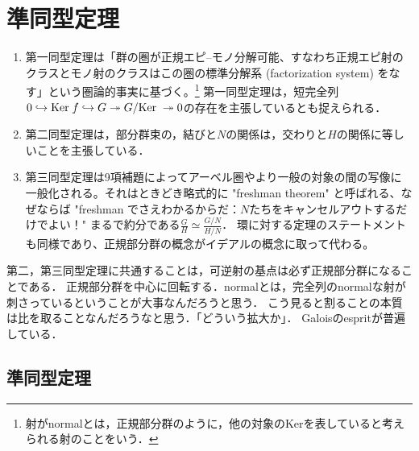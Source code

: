 \documentclass[uplatex,dvipdfmx]{jsreport}
\begin{document}
\section{準同型定理}

\begin{tcolorbox}[colframe=ForestGreen, colback=ForestGreen!10!white,breakable,colbacktitle=ForestGreen!40!white,coltitle=black,fonttitle=\bfseries\sffamily,
title=]
    \begin{enumerate}
        \item 第一同型定理は「群の圏が正規エピ–モノ分解可能、すなわち正規エピ射のクラスとモノ射のクラスはこの圏の標準分解系 (factorization system) をなす」という圏論的事実に基づく。\footnote{射がnormalとは，正規部分群のように，他の対象のKerを表していると考えられる射のことをいう．}
        第一同型定理は，短完全列$0\hookrightarrow\mathrm{Ker}\; f\hookrightarrow G\twoheadrightarrow G/\mathrm{Ker}\;\twoheadrightarrow 0$の存在を主張しているとも捉えられる．
        \item 第二同型定理は，部分群束の，結びと$N$の関係は，交わりと$H$の関係に等しいことを主張している．
        \item 第三同型定理は9項補題によってアーベル圏やより一般の対象の間の写像に一般化される。それはときどき略式的に "freshman theorem" と呼ばれる、なぜならば "freshman でさえわかるからだ：$N$たちをキャンセルアウトするだけでよい！"
        まるで約分である$\frac{G}{H}\simeq\frac{G/N}{H/N}$．
        環に対する定理のステートメントも同様であり、正規部分群の概念がイデアルの概念に取って代わる。
    \end{enumerate}
    第二，第三同型定理に共通することは，可逆射の基点は必ず正規部分群になることである．
    正規部分群を中心に回転する．normalとは，完全列のnormalな射が刺さっているということが大事なんだろうと思う．
    こう見ると割ることの本質は比を取ることなんだろうなと思う．「どういう拡大か」．
    Galoisのespritが普遍している．
\end{tcolorbox}

\subsection{準同型定理}
\end{document}

